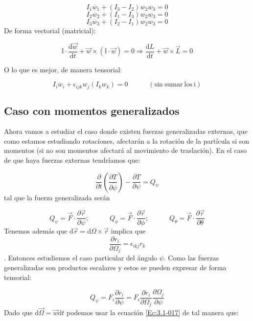 \documentclass[12pt,a4paper]{book}
\newcommand{\parentesis}[1]{\left( #1  \right)}
\newcommand{\parciales}[2]{\frac{\partial #1}{\partial #2}}
\newcommand{\pparciales}[2]{\parentesis{\parciales{#1}{#2}}}
\newcommand{\D}{\mathrm{d}}
\newcommand{\tquad}{\quad \quad \quad}
\begin{document}
\begin{equation}
I_1 \dot{w_1} + (I_3 -I_2) w_2 w_3 = 0
\end{equation}
\begin{equation}
I_2 \dot{w_2} + (I_1 -I_3) w_2 w_3 = 0
\end{equation}
\begin{equation}
I_3 \dot{w_3} + (I_2 -I_1) w_2 w_3 = 0
\end{equation}
De forma vectorial (matricial):

\begin{equation}
\mathbb{I} \cdot \dfrac{\D \vec{w}}{\D t} + \vec{w} \times (\mathbb{I} \cdot \vec{w}) = 0 \Longrightarrow \dfrac{\D L}{\D t} + \vec{w} \times \vec{L} = 0
\end{equation}

O lo que es mejor, de manera tensorial:

\begin{equation}
I_i \dot{w_i} + \epsilon_{ijk} w_j (I_k w_k) = 0 \tquad (\mathrm{sin \ sumar \ los  \ i})
\end{equation}

\subsection{Caso con momentos generalizados}
Ahora vamos a estudiar el caso donde existen fuerzas generalizadas externas, que como estamos estudiando rotaciones, afectarán a la rotación de la partícula si son momentos (si no son momentos afectará al movimiento de traslación). En el caso de que haya fuerzas externas tendríamos que:

\begin{equation}
 \parciales{}{t} \pparciales{T}{\dot{\psi}} - \parciales{T}{\psi}  =  Q_{\psi}
\end{equation}
tal que la fuerza generalizada serán

\begin{equation}
Q_\psi = \vec{F} \cdot \parciales{\vec{r}}{\psi}; \tquad  Q_\phi = \vec{F} \cdot  \parciales{\vec{r}}{\phi}; \tquad Q_\theta = \vec{F} \cdot  \parciales{\vec{r}}{\theta}
\end{equation}
Tenemos además que $\D \vec{r} = \D \Omega \times \vec{r}$ implica que $$ \parciales{r_i}{\Omega_j} = \epsilon_{ikj} r_k $$. Entonces estudiemos el caso particular del ángulo $\psi$. Como las fuerzas generalizadas son productos escalares y estos se pueden expresar de forma tensorial:

\begin{equation}
Q_\psi = F_i \parciales{r_i}{\psi} = F_i \parciales{r_i}{\Omega_j} \parciales{\Omega_j}{\psi} 
\end{equation}
Dado que $\D \vec{\Omega} = \vec{w} \D t$ podemos usar la ecuación \ref{Ec:3.1-017} de tal manera que:
\end{document}
